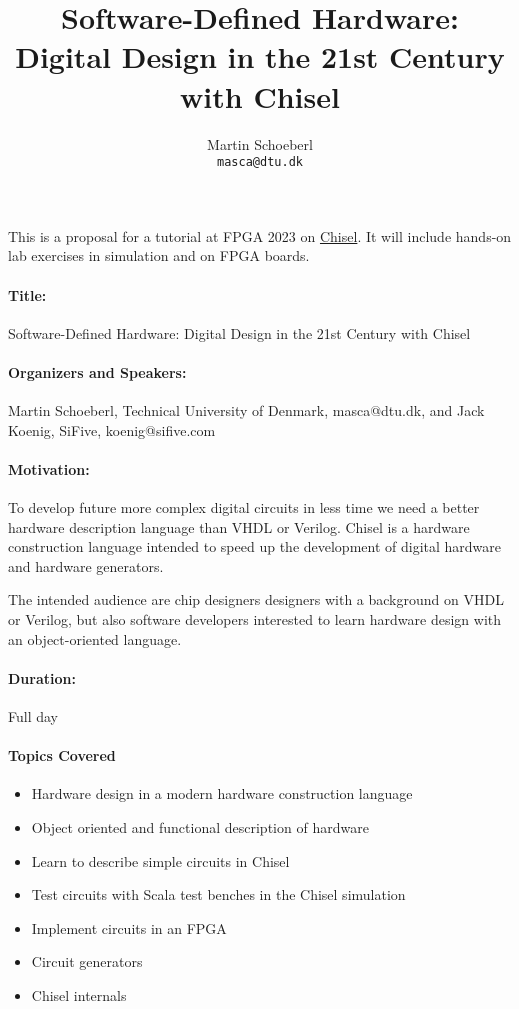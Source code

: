 \documentclass{article}
\begin{document}
\title{Software-Defined Hardware:\\ Digital Design in the 21st Century with Chisel}

\author{Martin Schoeberl\\
\texttt{masca@dtu.dk}}


\maketitle \thispagestyle{empty}

This is a proposal for a tutorial at FPGA 2023 on \href{https://chisel.eecs.berkeley.edu/}{Chisel}.
It will include hands-on lab exercises in simulation and on FPGA boards.


\paragraph{Title:} Software-Defined Hardware: Digital Design in the 21st Century with Chisel
\paragraph{Organizers and Speakers:} Martin Schoeberl, Technical University of Denmark, masca@dtu.dk, and
Jack Koenig, SiFive, koenig@sifive.com

\paragraph{Motivation:}

To develop future more complex digital circuits in less time we need a better hardware description
language than VHDL or Verilog. Chisel is a hardware construction language intended to
speed up the development of digital hardware and hardware generators.

The intended audience are chip designers designers with a background on VHDL or Verilog,
but also software developers interested to learn hardware design with an object-oriented language.
 
\paragraph{Duration:} Full day

\paragraph{Topics Covered}

\begin{itemize}
\item Hardware design in a modern hardware construction language
\item Object oriented and functional description of hardware
\item Learn to describe simple circuits in Chisel
\item Test circuits with Scala test benches in the Chisel simulation
\item Implement circuits in an FPGA
\item Circuit generators
\item Chisel internals
\end{itemize}
\end{document}
